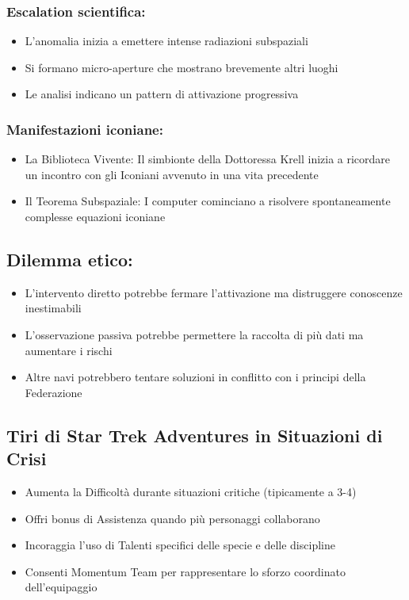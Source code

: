 \documentclass[letterpaper,twocolumn,openany,nodeprecatedcode]{dndbook}
\begin{document}
\subsubsection{Escalation scientifica:}

\begin{itemize}
    \item L'anomalia inizia a emettere intense radiazioni subspaziali
    \item Si formano micro-aperture che mostrano brevemente altri luoghi
    \item Le analisi indicano un pattern di attivazione progressiva
\end{itemize}


\subsubsection{Manifestazioni iconiane:}

\begin{itemize}
    \item La Biblioteca Vivente: Il simbionte della Dottoressa Krell inizia a ricordare un incontro con gli Iconiani avvenuto in una vita precedente
    \item Il Teorema Subspaziale: I computer cominciano a risolvere spontaneamente complesse equazioni iconiane
\end{itemize}


\subsection{Dilemma etico:}

\begin{itemize}
    \item L'intervento diretto potrebbe fermare l'attivazione ma distruggere conoscenze inestimabili
    \item L'osservazione passiva potrebbe permettere la raccolta di più dati ma aumentare i rischi
    \item Altre navi potrebbero tentare soluzioni in conflitto con i principi della Federazione
\end{itemize}



\subsection{Tiri di Star Trek Adventures in Situazioni di Crisi}

\begin{itemize}
    \item Aumenta la Difficoltà durante situazioni critiche (tipicamente a 3-4)
    \item Offri bonus di Assistenza quando più personaggi collaborano
    \item Incoraggia l'uso di Talenti specifici delle specie e delle discipline
    \item Consenti Momentum Team per rappresentare lo sforzo coordinato dell'equipaggio
\end{itemize}
\end{document}
